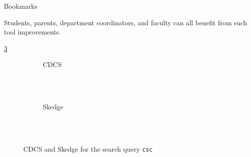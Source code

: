 Bookmarks

Students, parents, department coordinators, and faculty can all benefit from such tool improvements.

\ref{fig:sk-index}


\begin{figure}[ht]
    \centering
        \begin{subfigure}[h]{14cm}
            \centering
            \caption{CDCS}
            \label{fig:cdcs-index}
        \end{subfigure}\\
        \vspace{10pt}\\
        \begin{subfigure}[h]{14cm}
            \centering
            \caption{Skedge}
            \label{fig:sk-index}
        \end{subfigure}\\
        \vspace{20pt}\\
    \caption{CDCS and Skedge for the search query {\tt csc}}
\end{figure}

